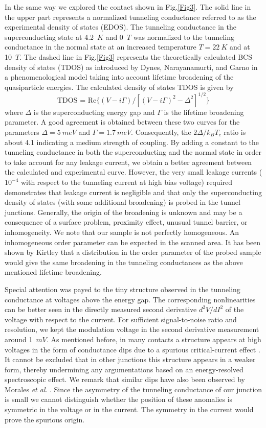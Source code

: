 \documentclass[twocolumn,amsmath,floats,showpacs,nofootinbib]{revtex4}
\begin{document}
In the same way we explored the contact shown in Fig.\ref{Fig3}. The solid line in the upper part represents a normalized tunneling conductance referred to as the experimental density of states (EDOS). The tunneling conductance in the superconducting state at 4.2~$K$ and 0~$T$ was normalized to the tunneling conductance in the normal state at an increased temperature $T = 22\ K$ and at 10~$T$. The dashed line in Fig.\ref{Fig3} represents the theoretically calculated BCS density of states (TDOS) as introduced by Dynes, Narayanamurti, and Garno \cite{16} in a phenomenological model taking into account lifetime broadening of the quasiparticle energies. The calculated density of states TDOS is given by
\begin{equation}
\label{eq__1}
\text{TDOS = Re}\{(V-i\Gamma)/[(V-i\Gamma)^2-\Delta^2]^{1/2}\}
\end{equation}
where $\Delta$ is the superconducting energy gap and $\Gamma$ is the lifetime broadening parameter. A good agreement is obtained between these two curves for the parameters $\Delta= 5\ meV$ and $\Gamma= 1.7\ meV$. Consequently, the $2\Delta/k_BT_c$ ratio is about 4.1 indicating a medium strength of coupling.
By adding a constant to the tunneling conductance in both the superconducting and the normal state in order to take account for any leakage current, we obtain a better agreement between the calculated and experimental curve. However, the very small leakage currents ($10^{-4}$ with respect to the tunneling current at high bias voltage) required demonstrates that leakage current is negligible and that only the superconducting density of states (with some additional broadening) is probed in the tunnel junctions. Generally, the origin of the broadening is unknown and may be a consequence of a surface problem, proximity effect, unusual tunnel barrier, or inhomogeneity. We note that our sample is not perfectly homogeneous. An inhomogeneous order parameter can be expected in the scanned area. It has been shown by Kirtley \cite{2} that a distribution in the order parameter of the probed sample would give the same broadening in the tunneling conductances as the above mentioned lifetime broadening.

Special attention was payed to the tiny structure observed in the tunneling conductance at voltages above the energy gap. The corresponding nonlinearities can be better seen in the directly measured second derivative $d^2V/dI^2$ of the voltage with respect to the current. For sufficient signal-to-noise ratio and resolution, we kept the modulation voltage in the second derivative measurement around 1~$mV$. As mentioned before, in many contacts a structure appears at high voltages in the form of conductance dips due to a spurious critical-current effect \cite{8}. It cannot be excluded that in other junctions this structure appears in a weaker form, thereby undermining any argumentations based on an energy-resolved spectroscopic effect. We remark that similar dips have also been observed by Morales \emph{et al}. \cite{17}. Since the asymmetry of the tunneling conductance of our junction is small we cannot distinguish whether the position of these anomalies is symmetric in the voltage or in the current. The symmetry in the current would prove the spurious origin.
\end{document}
